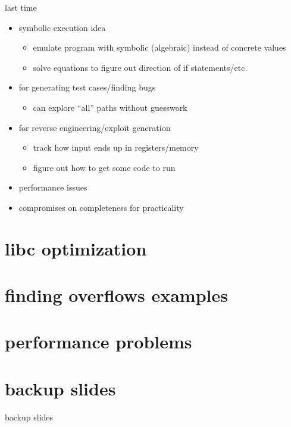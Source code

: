 \date{}
\title{}
\date{}
\usepackage[outputdir=latex.out]{minted}

\begin{frame}
    \titlepage
\end{frame}



\begin{frame}{last time}
    \begin{itemize}
    \item symbolic execution idea
        \begin{itemize}
        \item emulate program with symbolic (algebraic) instead of concrete values
        \item solve equations to figure out direction of if statements/etc.
        \end{itemize}
    \item for generating test cases/finding bugs
        \begin{itemize}
        \item can explore ``all'' paths without guesswork
        \end{itemize}
    \item for reverse engineering/exploit generation
        \begin{itemize}
        \item track how input ends up in registers/memory
        \item figure out how to get some code to run
        \end{itemize}
    \item performance issues 
    \item compromises on completeness for practicality
    \end{itemize}
\end{frame}



\section{libc optimization}


\section{finding overflows examples}


\section{performance problems}








\section{backup slides}
\begin{frame}{backup slides}
\end{frame}


